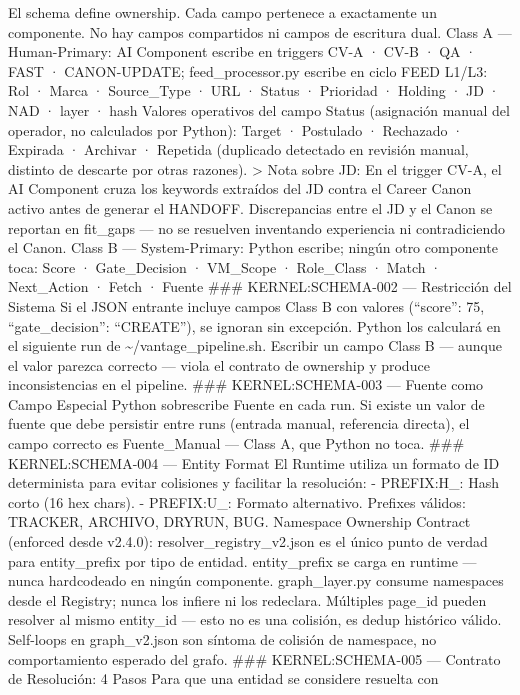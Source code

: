 \documentclass[
]{article}
\begin{document}
El schema define ownership. Cada campo pertenece a exactamente un
componente. No hay campos compartidos ni campos de escritura dual. Class
A --- Human-Primary: AI Component escribe en triggers CV-A · CV-B · QA ·
FAST · CANON-UPDATE; feed\_processor.py escribe en ciclo FEED L1/L3: Rol
· Marca · Source\_Type · URL · Status · Prioridad · Holding · JD · NAD ·
layer · hash Valores operativos del campo Status (asignación manual del
operador, no calculados por Python): Target · Postulado · Rechazado ·
Expirada · Archivar · Repetida (duplicado detectado en revisión manual,
distinto de descarte por otras razones). \textgreater{} Nota sobre JD:
En el trigger CV-A, el AI Component cruza los keywords extraídos del JD
contra el Career Canon activo antes de generar el HANDOFF. Discrepancias
entre el JD y el Canon se reportan en fit\_gaps --- no se resuelven
inventando experiencia ni contradiciendo el Canon. Class B ---
System-Primary: Python escribe; ningún otro componente toca: Score ·
Gate\_Decision · VM\_Scope · Role\_Class · Match · Next\_Action · Fetch
· Fuente \#\#\# KERNEL:SCHEMA-002 --- Restricción del Sistema Si el JSON
entrante incluye campos Class B con valores (``score'': 75,
``gate\_decision'': ``CREATE''), se ignoran sin excepción. Python los
calculará en el siguiente run de \textasciitilde/vantage\_pipeline.sh.
Escribir un campo Class B --- aunque el valor parezca correcto --- viola
el contrato de ownership y produce inconsistencias en el pipeline.
\#\#\# KERNEL:SCHEMA-003 --- Fuente como Campo Especial Python
sobrescribe Fuente en cada run. Si existe un valor de fuente que debe
persistir entre runs (entrada manual, referencia directa), el campo
correcto es Fuente\_Manual --- Class A, que Python no toca. \#\#\#
KERNEL:SCHEMA-004 --- Entity Format El Runtime utiliza un formato de ID
determinista para evitar colisiones y facilitar la resolución: -
PREFIX:H\_: Hash corto (16 hex chars). - PREFIX:U\_: Formato
alternativo. Prefixes válidos: TRACKER, ARCHIVO, DRYRUN, BUG. Namespace
Ownership Contract (enforced desde v2.4.0): resolver\_registry\_v2.json
es el único punto de verdad para entity\_prefix por tipo de entidad.
entity\_prefix se carga en runtime --- nunca hardcodeado en ningún
componente. graph\_layer.py consume namespaces desde el Registry; nunca
los infiere ni los redeclara. Múltiples page\_id pueden resolver al
mismo entity\_id --- esto no es una colisión, es dedup histórico válido.
Self-loops en graph\_v2.json son síntoma de colisión de namespace, no
comportamiento esperado del grafo. \#\#\# KERNEL:SCHEMA-005 --- Contrato
de Resolución: 4 Pasos Para que una entidad se considere resuelta con
\end{document}

